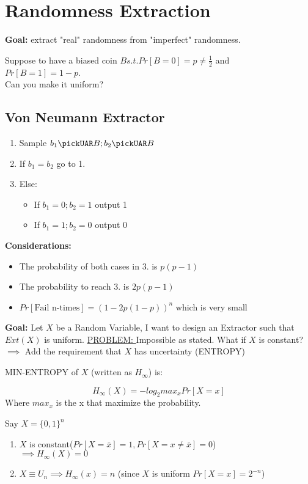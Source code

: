 
\section{Randomness Extraction}

\textbf{Goal:} extract "real" randomness from "imperfect" randomness.

\bigskip
Suppose to have a biased coin $B s.t. Pr[B=0]=p\neq \frac{1}{2}$ and\\ $Pr[B=1]=1-p$.\\
Can you make it uniform?

\subsection{Von Neumann Extractor}
\begin{enumerate}
    \item Sample $b_1\pickUAR B; b_2\pickUAR B$
    \item If $b_1=b_2$ go to 1.
    \item Else:
    \begin{itemize}
        \item If $b_1=0;b_2=1$ output 1
        \item If $b_1=1;b_2=0$ output 0 
    \end{itemize}
\end{enumerate}
\textbf{Considerations: }
\begin{itemize}
    \item The probability of both cases in 3. is $p(p-1)$
    \item The probability to reach 3. is $2p(p-1)$
    \item $Pr[\text{Fail n-times}]=(1-2p(1-p))^n$ which is very small
\end{itemize}

\textbf{Goal: } Let $X$ be a Random Variable, I want to design an Extractor such that $Ext(X)$ is uniform.
\underline{PROBLEM: } Impossible as stated. What if $X$ is constant? $\implies$ Add the requirement that $X$ has uncertainty (ENTROPY)

\begin{definition}
    MIN-ENTROPY of $X$ (written as $H_{\infty}$) is:

    $$H_{\infty}(X)=-log_2 max_x Pr[X=x]$$
    Where $max_x$ is the x that maximize the probability.
\end{definition}
\begin{example}
    Say $X=\{0,1\}^n$

    \begin{enumerate}
        \item $X$ is constant($Pr[X=\bar{x}]=1, Pr[X=x\neq \bar{x}]=0$)\\
        $\implies H_{\infty}(X)=0$
        \item $X\equiv U_n \implies H_{\infty}(x)=n$ (since $X$ is uniform $Pr[X=x]=2^{-n}$)   
    \end{enumerate}
\end{example}

